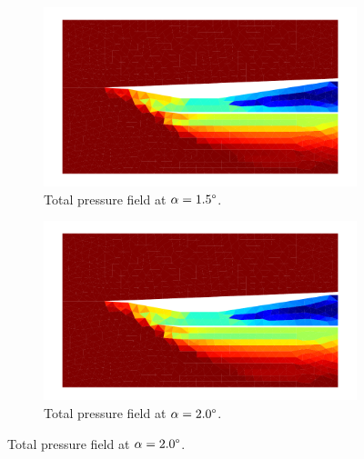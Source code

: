 \begin{figure}[h]
    \begin{subfigure}[h]{0.48\linewidth}
        \centering
        \includegraphics[width=\linewidth]{rep/q5/pt_a15.pdf}
        \caption{Total pressure field at $\alpha=1.5\degree$.}
    \end{subfigure}
    \begin{subfigure}[h]{0.48\linewidth}
        \centering
        \includegraphics[width=\linewidth]{rep/q5/pt_a20.pdf}
        \caption{Total pressure field at $\alpha=2.0\degree$.}
    \end{subfigure}


\end{figure}
